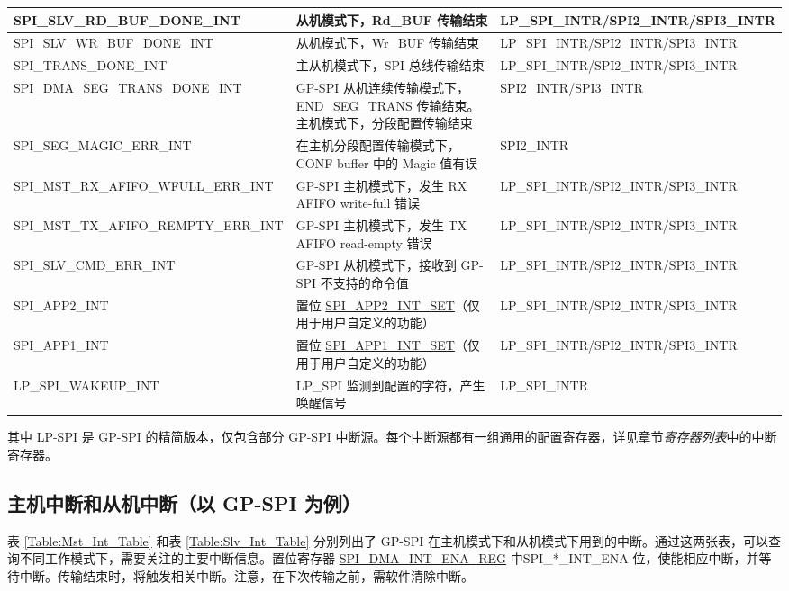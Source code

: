 \documentclass[main\_\_CN.tex]{subfiles}
\begin{document}
\begin{longtable}{ | L{5cm} | L{6.5cm} | L{4cm} | }
\label{int:SPISLVRDBUFDONEINT}SPI\_SLV\_RD\_BUF\_DONE\_INT & 从机模式下，Rd\_BUF 传输结束 & LP\_SPI\_INTR/SPI2\_INTR/SPI3\_INTR\\ \hline
\label{int:SPISLVWRBUFDONEINT}SPI\_SLV\_WR\_BUF\_DONE\_INT & 从机模式下，Wr\_BUF 传输结束 & LP\_SPI\_INTR/SPI2\_INTR/SPI3\_INTR \\ \hline
\label{int:SPITRANSDONEINT}SPI\_TRANS\_DONE\_INT & 主从机模式下，SPI 总线传输结束 & LP\_SPI\_INTR/SPI2\_INTR/SPI3\_INTR \\ \hline
\label{int:SPIDMASEGTRANSDONEINT}SPI\_DMA\_SEG\_TRANS\_DONE\newline\_INT & GP-SPI 从机连续传输模式下，END\_SEG\_TRANS 传输结束。主机模式下，分段配置传输结束 & SPI2\_INTR/SPI3\_INTR\\ \hline
\label{int:SPISEGMAGICERRINT} SPI\_SEG\_MAGIC\_ERR\_INT & 在主机分段配置传输模式下，CONF buffer 中的 Magic 值有误 &SPI2\_INTR \\ \hline
\label{int:SPIMSTRXAFIFOWFULLERRINT} SPI\_MST\_RX\_AFIFO\_WFULL\newline\_ERR\_INT & GP-SPI 主机模式下，发生 RX AFIFO write-full 错误 & LP\_SPI\_INTR/SPI2\_INTR/SPI3\_INTR\\ \hline
\label{int:SPIMSTTXAFIFOREMPTYERRINT} SPI\_MST\_TX\_AFIFO\_REMPTY\newline\_ERR\_INT &GP-SPI 主机模式下，发生 TX AFIFO read-empty 错误 & LP\_SPI\_INTR/SPI2\_INTR/SPI3\_INTR\\ \hline
\label{int:SPISLVCMDERRINT} SPI\_SLV\_CMD\_ERR\_INT & GP-SPI 从机模式下，接收到 GP-SPI 不支持的命令值 & LP\_SPI\_INTR/SPI2\_INTR/SPI3\_INTR\\ \hline
\label{int:SPIAPP2INT}SPI\_APP2\_INT & 置位 \hyperref[fielddesc:SPIAPP1INTSET]{SPI\_APP2\_INT\_SET}（仅用于用户自定义的功能）& LP\_SPI\_INTR/SPI2\_INTR/SPI3\_INTR\\ \hline
\label{int:SPIAPP1INT}SPI\_APP1\_INT & 置位 \hyperref[fielddesc:SPIAPP1INTSET]{SPI\_APP1\_INT\_SET}（仅用于用户自定义的功能）& LP\_SPI\_INTR/SPI2\_INTR/SPI3\_INTR\\ \hline
\label{int:LPSPIWAKEUPINT} LP\_SPI\_WAKEUP\_INT & LP\_SPI 监测到配置的字符，产生唤醒信号 & LP\_SPI\_INTR\\ \hline
\end{longtable}

其中 LP-SPI 是 GP-SPI 的精简版本，仅包含部分 GP-SPI 中断源。每个中断源都有一组通用的配置寄存器，详见章节\hyperref[sec:spi-reg-summ]{\textit{寄存器列表}}中的中断寄存器。

\subsection{主机中断和从机中断（以 GP-SPI 为例）}
表 \ref{Table:Mst_Int_Table} 和表 \ref{Table:Slv_Int_Table} 分别列出了 GP-SPI 在主机模式下和从机模式下用到的中断。通过这两张表，可以查询不同工作模式下，需要关注的主要中断信息。置位寄存器 \hyperref[regdesc:SPIDMAINTENAREG]{SPI\_DMA\_INT\_ENA\_REG} 中SPI\_*\_INT\_ENA 位，使能相应中断，并等待中断。传输结束时，将触发相关中断。注意，在下次传输之前，需软件清除中断。
\end{document}
